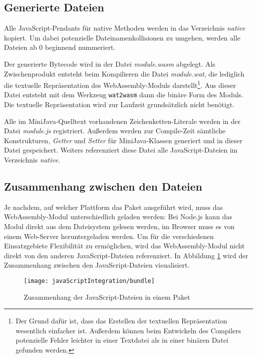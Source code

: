 \subsection{Generierte Dateien}

Alle JavaScript-Pendants für native Methoden werden in das Verzeichnis \emph{native} kopiert. Um dabei potenzielle Dateinamenkollisionen zu umgehen, werden alle Dateien ab 0 beginnend nummeriert.

Der generierte Bytecode wird in der Datei \emph{module.wasm} abgelegt. Als Zwischenprodukt entsteht beim Kompilieren die Datei \emph{module.wat}, die lediglich die textuelle Repräsentation des WebAssembly-Moduls darstellt\footnote{Der Grund dafür ist, dass das Erstellen der textuellen Repräsentation wesentlich einfacher ist. Außerdem können beim Entwickeln des Compilers potenzielle Fehler leichter in einer Textdatei als in einer binären Datei gefunden werden.}. Aus dieser Datei entsteht mit dem Werkzeug \lstinline{wat2wasm} \cite{WABT} dann die binäre Form des Moduls. Die textuelle Repräsentation wird zur Laufzeit grundsätzlich nicht benötigt.

Alle im MiniJava-Quelltext vorhandenen Zeichenketten-Literale werden in der Datei \emph{module.js} registriert. Außerdem werden zur Compile-Zeit sämtliche Konstrukturen, \emph{Getter} und \emph{Setter} für MiniJava-Klassen generiert und in dieser Datei gespeichert. Weiters referenziert diese Datei alle JavaScript-Dateien im Verzeichnis \emph{native}.

\subsection{Zusammenhang zwischen den Dateien}

Je nachdem, auf welcher Plattform das Paket ausgeführt wird, muss das WebAssembly-Modul unterschiedlich geladen werden: Bei Node.js kann das Modul direkt aus dem Dateisystem gelesen werden, im Browser muss es von einem Web-Server heruntergeladen werden. Um für die verschiedenen Einsatzgebiete Flexibilität zu ermöglichen, wird das WebAssembly-Modul nicht direkt von den anderen JavaScript-Dateien referenziert. In Abbildung \ref{fig:bundleStructure} wird der Zusammenhang zwischen den JavaScript-Dateien visualisiert.

\begin{figure}[]
    \centering
    \texttt{[image: javaScriptIntegration/bundle]}
    \caption{Zusammenhang der JavaScript-Dateien in einem Paket}
    \label{fig:bundleStructure}
\end{figure}

